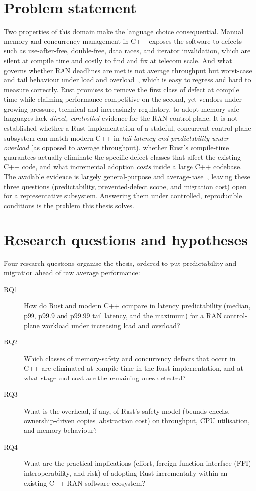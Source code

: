 \documentclass[english,oneside,a4paper,censored,csm,software-track-2020]{HYthesisML}
\begin{document}
\section{Problem statement}
Two properties of this domain make the language choice consequential. Manual memory and
concurrency management in C++ exposes the software to defects such as use-after-free,
double-free, data races, and iterator invalidation, which are silent at compile time and costly
to find and fix at telecom scale. And what governs whether RAN deadlines are met is not average
throughput but worst-case and tail behaviour under load and overload~\cite{dean2013tail}, which
is easy to regress and hard to measure correctly. Rust promises to remove the first class of
defect at compile time while claiming performance competitive on the second, yet vendors under
growing pressure, technical and increasingly regulatory, to adopt memory-safe languages lack
\emph{direct, controlled} evidence for the RAN control plane. It is not established whether a
Rust implementation of a stateful, concurrent control-plane subsystem can match modern C++ in
\emph{tail latency and predictability under overload} (as opposed to average throughput), whether
Rust's compile-time guarantees actually eliminate the specific defect classes that affect the
existing C++ code, and what incremental adoption \emph{costs} inside a large C++ codebase. The
available evidence is largely general-purpose and
average-case~\cite{balasubramanian2017rust,qin2020rust}, leaving these three questions
(predictability, prevented-defect scope, and migration cost) open for a representative subsystem.
Answering them under controlled, reproducible conditions is the problem this thesis solves.

\section{Research questions and hypotheses}\label{sec:rqs}
Four research questions organise the thesis, ordered to put predictability and migration ahead of
raw average performance:

\begin{description}
  \item[RQ1] How do Rust and modern C++ compare in latency predictability (median, p99,
        p99.9 and p99.99 tail latency, and the maximum) for a RAN control-plane workload
        under increasing load and overload?
  \item[RQ2] Which classes of memory-safety and concurrency defects that occur in C++ are
        eliminated at compile time in the Rust implementation, and at what stage and cost
        are the remaining ones detected?
  \item[RQ3] What is the overhead, if any, of Rust's safety model (bounds checks,
        ownership-driven copies, abstraction cost) on throughput, CPU utilisation, and
        memory behaviour?
  \item[RQ4] What are the practical implications (effort, foreign function interface (FFI)
        interoperability, and risk) of adopting Rust incrementally within an existing C++ RAN
        software ecosystem?
\end{description}
\end{document}
